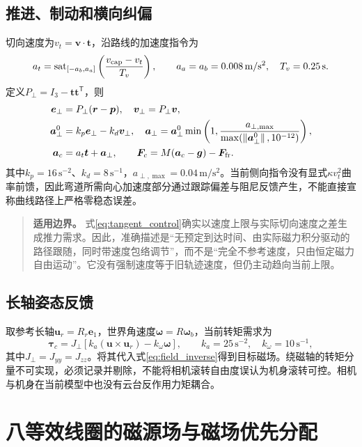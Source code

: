 \documentclass[UTF8,a4paper,zihao=5,fontset=windows]{ctexart}
\newcommand{\vect}[1]{\bm{#1}}
\newcommand{\norm}[1]{\left\lVert#1\right\rVert}
\newcommand{\sat}{\operatorname{sat}}
\newcommand{\unit}[1]{\,\mathrm{#1}}
\newenvironment{boundary}{\begin{quote}\small\color{navy}\textbf{适用边界。}}{\end{quote}}
\begin{document}
\subsection{推进、制动和横向纠偏}
切向速度为$v_t=\vect v\cdot\vect t$，沿路线的加速度指令为
\begin{equation}
a_t=\sat_{[-a_b,a_a]}\left(\frac{v_{\rm cap}-v_t}{T_v}\right),\qquad
a_a=a_b=0.008\unit{m/s^2},\quad T_v=0.25\unit s.
\label{eq:tangent_control}
\end{equation}
定义$P_\perp=I_3-\vect t\vect t^{\mathsf T}$，则
\begin{align}
\vect e_\perp&=P_\perp(\vect r-\vect p),\quad\vect v_\perp=P_\perp\vect v,\\
\vect a_\perp^0&=k_p\vect e_\perp-k_d\vect v_\perp,\quad
\vect a_\perp=\vect a_\perp^0\min\left(1,\frac{a_{\perp,\max}}{\max(\norm{\vect a_\perp^0},10^{-12})}\right),\\
\vect a_c&=a_t\vect t+\vect a_\perp,\qquad\vect F_c=M(\vect a_c-\vect g)-\vect F_{\rm fr}.
\label{eq:force_command}
\end{align}
其中$k_p=16\unit{s^{-2}}$、$k_d=8\unit{s^{-1}}$，$a_{\perp,\max}=0.04\unit{m/s^2}$。当前侧向指令没有显式$\kappa v_t^2$曲率前馈，因此弯道所需向心加速度部分通过跟踪偏差与阻尼反馈产生，不能直接宣称曲线路径上严格零稳态误差。
\begin{boundary}
式\eqref{eq:tangent_control}确实以速度上限与实际切向速度之差生成推力需求。因此，准确描述是“无预定到达时间、由实际磁力积分驱动的路径跟随，同时带速度包络调节”，而不是“完全不参考速度，只由恒定磁力自由运动”。它没有强制速度等于旧轨迹速度，但仍主动趋向当前上限。
\end{boundary}

\subsection{长轴姿态反馈}
取参考长轴$\vect u_r=R_r\vect e_1$，世界角速度$\vect\omega=R\vect\omega_b$，当前转矩需求为
\begin{equation}
\vect\tau_c=J_\perp\left[k_a(\vect u\times\vect u_r)-k_\omega\vect\omega\right],\qquad
k_a=25\unit{s^{-2}},\quad k_\omega=10\unit{s^{-1}},
\label{eq:axis_control}
\end{equation}
其中$J_\perp=J_{yy}=J_{zz}$。将其代入式\eqref{eq:field_inverse}得到目标磁场。绕磁轴的转矩分量不可实现，必须记录并剔除，不能将相机滚转自由度误认为机身滚转可控。相机与机身在当前模型中也没有云台反作用力矩耦合。

\section{八等效线圈的磁源场与磁场优先分配}
\end{document}
